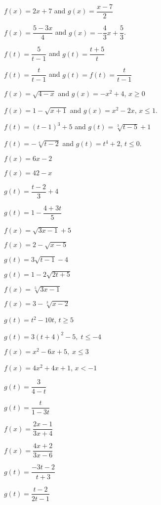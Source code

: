 \startexenum

\label{ExercisesforInverseFunctions}

\begin{exenum}


\item $f(x) = 2x+7$ and $g(x) = \dfrac{x-7}{2}$ \label{verifyinversehwfirst}
\item $f(x) = \dfrac{5-3x}{4}$ and $g(x) = -\dfrac{4}{3} x + \dfrac{5}{3}$.
\item $f(t) = \dfrac{5}{t-1}$ and $g(t) = \dfrac{t+5}{t}$ 
\item \label{owninverseexample} $f(t)  = \dfrac{t}{t-1}$ and $g(t) = f(t) =  \dfrac{t}{t-1}$
\item $f(x) = \sqrt{4-x}$ and $g(x) = -x^2+4$, $x \geq 0$
\item $f(x) = 1-\sqrt{x+1}$ and $g(x) = x^2-2x$, $x \leq 1$.
\item $f(t) = (t-1)^3+5$ and $g(t) = \sqrt[3]{t-5}+1$
\item  $f(t) = -\sqrt[4]{t-2}$ and $g(t) = t^4+2$, $t \leq 0$.  \label{verifyinversehwlast}


\item $f(x) = 6x - 2$ \label{inversehwfirst}
\item $f(x) = 42-x$
\item $g(t) = \dfrac{t-2}{3} + 4$
\item $g(t)  = 1 - \dfrac{4+3t}{5}$
\item $f(x) = \sqrt{3x-1}+5$
\item $f(x) = 2-\sqrt{x - 5}$
\item $g(t) = 3\sqrt{t-1}-4$
\item $g(t) = 1 - 2\sqrt{2t+5}$
\item $f(x) = \sqrt[5]{3x-1}$
\item $f(x) = 3-\sqrt[3]{x-2}$
\item $g(t) = t^2 - 10t$, $t \geq 5$
\item $g(t) = 3(t + 4)^{2} - 5, \; t \leq -4$
\item $f(x) = x^2-6x+5, \; x \leq 3$
\item $f(x) = 4x^2 + 4x + 1$, $x < -1$
\item $g(t) = \dfrac{3}{4-t}$
\item $g(t) = \dfrac{t}{1-3t}$
\item $f(x) = \dfrac{2x-1}{3x+4}$
\item $f(x) = \dfrac{4x + 2}{3x - 6}$
\item $g(t) = \dfrac{-3t - 2}{t + 3}$ 
\item $g(t) = \dfrac{t-2}{2t-1}$  \label{inversehwlast}


\end{exenum}
